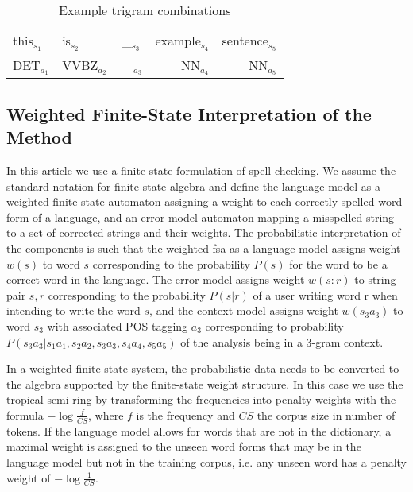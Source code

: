 \documentclass{llncs}
\begin{document}
\begin{table}
\caption{Example trigram combinations\label{fig:example}}
\begin{center}
\begin{tabular}{llcrr}
\hline
this$_{s_1}$ & is$_{s_2}$ & \_$_{s_3}$ & example$_{s_4}$ & sentence$_{s_5}$\\
DET$_{a_1}$ & VVBZ$_{a_2}$ & \_ $_{a_3}$& NN$_{a_4}$ & NN$_{a_5}$\\
\hline
\end{tabular}
\end{center}
\end{table}

\subsection{Weighted Finite-State Interpretation of the Method}

In this article we use a finite-state formulation of spell-checking. We
assume the standard notation for finite-state algebra and define the language
model as a weighted finite-state automaton assigning a weight to each correctly
spelled word-form of a language, and an error model automaton mapping a
misspelled string to a set of corrected strings and their weights. The
probabilistic interpretation of the components is such that the weighted fsa as
a language model assigns weight $w(s)$ to word $s$ corresponding to the probability
$P(s)$ for the word to be a correct word in the language. The error model assigns
weight $w(s:r)$ to string pair $s, r$ corresponding to the probability $P(s|r)$ of a
user writing word r when intending to write the word $s$, and the context model
assigns weight $w(s_3 a_3)$ to word $s_3$ with associated POS tagging $a_3$
corresponding to probability $P(s_3 a_3|s_1 a_1, s_2 a_2, s_3 a_3, s_4 a_4, s_5
a_5)$ of the analysis being in a 3-gram context.

In a weighted finite-state system, the probabilistic data needs to be converted
to the algebra supported by the finite-state weight structure.
In this case we use the tropical semi-ring by transforming the
frequencies into penalty weights with the formula $-\log\frac{f}{CS}$, where $f$ is
the frequency and $CS$ the corpus size in number of tokens. If the language
model allows for words that are not in the dictionary, a maximal weight is assigned
to the unseen word forms that may be in the language model but not in the training
corpus, i.e.  any unseen word has a penalty weight of $-\log\frac{1}{CS}$.
\end{document}

